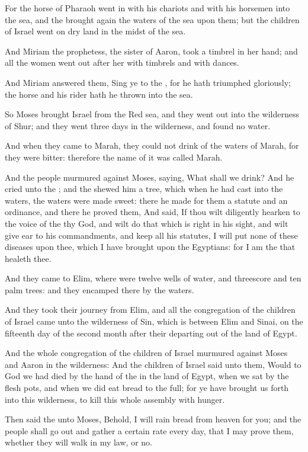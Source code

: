 \Verse For the horse of Pharaoh went in with his chariots and with his horsemen into the sea, and the \LORD brought again the waters of the sea upon them; but the children of Israel went on dry land in the midst of the sea.

\Verse And Miriam the prophetess, the sister of Aaron, took a timbrel in her hand; and all the women went out after her with timbrels and with dances.

\Verse And Miriam answered them, Sing ye to the \LORD, for he hath triumphed gloriously; the horse and his rider hath he thrown into the sea.

\Verse So Moses brought Israel from the Red sea, and they went out into the wilderness of Shur; and they went three days in the wilderness, and found no water.

\Verse And when they came to Marah, they could not drink of the waters of Marah, for they were bitter: therefore the name of it was called Marah.

\Verse And the people murmured against Moses, saying, What shall we drink?  \Verse And he cried unto the \LORD; and the \LORD shewed him a tree, which when he had cast into the waters, the waters were made sweet: there he made for them a statute and an ordinance, and there he proved them, \Verse And said, If thou wilt diligently hearken to the voice of the \LORD thy God, and wilt do that which is right in his sight, and wilt give ear to his commandments, and keep all his statutes, I will put none of these diseases upon thee, which I have brought upon the Egyptians: for I am the \LORD that healeth thee.

\Verse And they came to Elim, where were twelve wells of water, and threescore and ten palm trees: and they encamped there by the waters.

\Chapter
\Verse And they took their journey from Elim, and all the congregation of the children of Israel came unto the wilderness of Sin, which is between Elim and Sinai, on the fifteenth day of the second month after their departing out of the land of Egypt.

\Verse And the whole congregation of the children of Israel murmured against Moses and Aaron in the wilderness: \Verse And the children of Israel said unto them, Would to God we had died by the hand of the \LORD in the land of Egypt, when we sat by the flesh pots, and when we did eat bread to the full; for ye have brought us forth into this wilderness, to kill this whole assembly with hunger.

\Verse Then said the \LORD unto Moses, Behold, I will rain bread from heaven for you; and the people shall go out and gather a certain rate every day, that I may prove them, whether they will walk in my law, or no.

